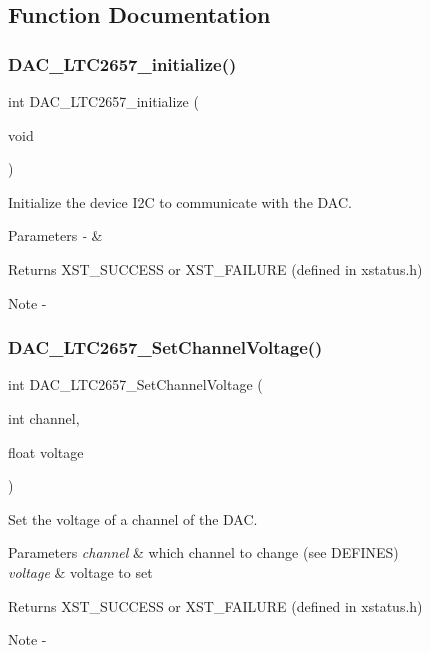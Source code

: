 \subsection{Function Documentation}
\mbox{\label{iic___d_a_c___l_t_c2657_8c_a992e56cd11142e4126d81f0c15f253c5}} 
\subsubsection{DAC\_LTC2657\_initialize()}
{\footnotesize\ttfamily int D\+A\+C\+\_\+\+L\+T\+C2657\+\_\+initialize (\begin{DoxyParamCaption}\item[{void}]{ }\end{DoxyParamCaption})}



Initialize the device I2C to communicate with the D\+AC. 


\begin{DoxyParams}{Parameters}
{\em -\/} & \\
\hline
\end{DoxyParams}
\begin{DoxyReturn}{Returns}
X\+S\+T\+\_\+\+S\+U\+C\+C\+E\+SS or X\+S\+T\+\_\+\+F\+A\+I\+L\+U\+RE (defined in xstatus.\+h)
\end{DoxyReturn}
\begin{DoxyNote}{Note}
-\/ 
\end{DoxyNote}
\mbox{\label{iic___d_a_c___l_t_c2657_8c_a8fc10bb603177039a45001f7b24b4622}} 
\subsubsection{DAC\_LTC2657\_SetChannelVoltage()}
{\footnotesize\ttfamily int D\+A\+C\+\_\+\+L\+T\+C2657\+\_\+\+Set\+Channel\+Voltage (\begin{DoxyParamCaption}\item[{int}]{channel,  }\item[{float}]{voltage }\end{DoxyParamCaption})}



Set the voltage of a channel of the D\+AC. 


\begin{DoxyParams}{Parameters}
{\em channel} & which channel to change (see D\+E\+F\+I\+N\+ES) \\
\hline
{\em voltage} & voltage to set\\
\hline
\end{DoxyParams}
\begin{DoxyReturn}{Returns}
X\+S\+T\+\_\+\+S\+U\+C\+C\+E\+SS or X\+S\+T\+\_\+\+F\+A\+I\+L\+U\+RE (defined in xstatus.\+h)
\end{DoxyReturn}
\begin{DoxyNote}{Note}
-\/ 
\end{DoxyNote}

